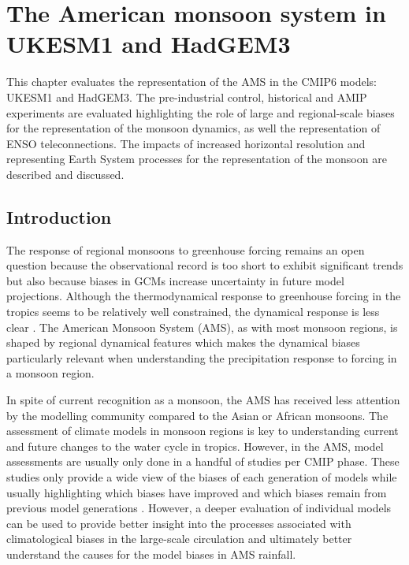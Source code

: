 \chapter{\label{ch:4-ams}The American monsoon system in UKESM1 and HadGEM3}


This chapter evaluates the representation of the AMS in the CMIP6 models: UKESM1 and HadGEM3. The pre-industrial control, historical and AMIP experiments are evaluated highlighting the role of large and regional-scale biases for the representation of the monsoon dynamics, as well the representation of ENSO teleconnections.
The impacts of increased horizontal resolution and representing Earth System processes for the representation of the monsoon are described and discussed. 




\section{Introduction}

The response of regional monsoons to greenhouse forcing remains an open question \citep{zhou2016,pascale2019} because the observational record is too short to exhibit significant trends but also because biases in GCMs increase uncertainty in future model projections.
Although the thermodynamical response to greenhouse forcing in the tropics seems to be relatively well constrained, the dynamical response is less clear \citep{shepherd2014}. The American Monsoon System (AMS), as with most monsoon regions, is shaped by regional dynamical features which makes the dynamical biases particularly relevant when understanding the precipitation response to forcing in a monsoon region. %

In spite of current recognition as a monsoon, the AMS has received less attention by the modelling community compared to the Asian or African monsoons. 
The assessment of climate models in monsoon regions is key to understanding current and future changes to the water cycle in tropics. However, in the AMS, model assessments are usually only done in a handful of studies per CMIP phase.  These studies only provide a wide view of the biases of each generation of models while usually highlighting which biases have improved and which biases remain from previous model generations \citep[see e.g.][]{geil2013,ryu2014}. However, a deeper evaluation of individual models can be used to provide better insight into the processes associated with climatological biases in the large-scale circulation and ultimately better understand the causes for the model biases in AMS rainfall. 

